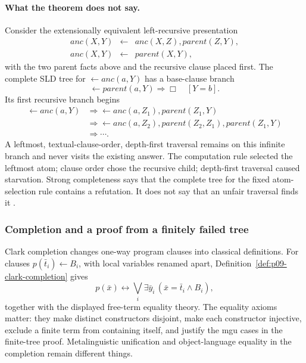 \paragraph{What the theorem does not say.}
Consider the extensionally equivalent left-recursive presentation
\[
\begin{array}{rcl}
 anc(X,Y)&\leftarrow&anc(X,Z),parent(Z,Y),\\
 anc(X,Y)&\leftarrow&parent(X,Y),
\end{array}
\]
with the two parent facts above and the recursive clause placed first.  The
complete SLD tree for \(\leftarrow anc(a,Y)\) has a base-clause branch
\[
 \leftarrow parent(a,Y)\Longrightarrow\Box\quad[Y=b].
\]
Its first recursive branch begins
\[
\begin{aligned}
 \leftarrow anc(a,Y)
 &\Longrightarrow
 \leftarrow anc(a,Z_1),parent(Z_1,Y)\\
 &\Longrightarrow
 \leftarrow anc(a,Z_2),parent(Z_2,Z_1),parent(Z_1,Y)\\
 &\Longrightarrow\cdots .
\end{aligned}
\]
A leftmost, textual-clause-order, depth-first traversal remains on this infinite
branch and never visits the existing answer.  The computation rule selected the
leftmost atom; clause order chose the recursive child; depth-first traversal
caused starvation.  Strong completeness says that the complete tree for the
fixed atom-selection rule contains a refutation.  It does not say that an
unfair traversal finds it
\cite[\S6, discussion after thm.~6.6]{AptVanEmden1982}.

\subsubsection{Completion and a proof from a finitely failed tree}

Clark completion changes one-way program clauses into classical definitions.
For clauses \(p(\bar t_i)\leftarrow B_i\), with local variables renamed apart,
Definition~\ref{def:p09-clark-completion} gives
\[
 p(\bar x)\leftrightarrow
 \bigvee_i\exists\bar y_i\,
   (\bar x=\bar t_i\land B_i),
\]
together with the displayed free-term equality theory.  The equality axioms
matter: they make distinct constructors disjoint, make each constructor
injective, exclude a finite term from containing itself, and justify the mgu
cases in the finite-tree proof.  Metalinguistic unification and object-language
equality in the completion remain different things.

